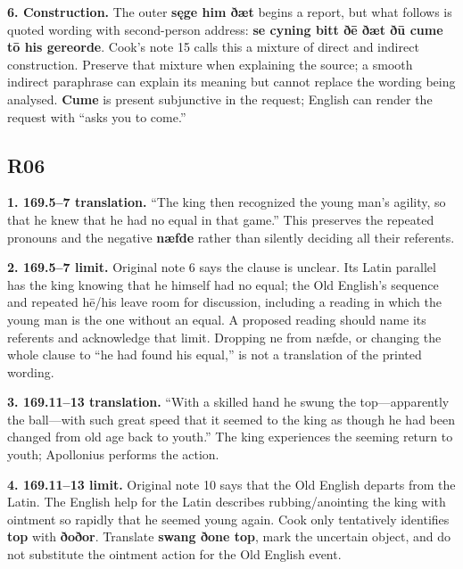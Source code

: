 \textbf{6. Construction.} The outer \textbf{sęge him ðæt} begins a report, but what follows is quoted wording with second-person address: \textbf{se cyning bitt ðē ðæt ðū cume tō his gereorde}. Cook’s note 15 calls this a mixture of direct and indirect construction. Preserve that mixture when explaining the source; a smooth indirect paraphrase can explain its meaning but cannot replace the wording being analysed. \textbf{Cume} is present subjunctive in the request; English can render the request with “asks you to come.”

\subsection*{R06}

\textbf{1. 169.5–7 translation.} “The king then recognized the young man’s agility, so that he knew that he had no equal in that game.” This preserves the repeated pronouns and the negative \textbf{næfde} rather than silently deciding all their referents.

\textbf{2. 169.5–7 limit.} Original note 6 says the clause is unclear. Its Latin parallel has the king knowing that he himself had no equal; the Old English’s sequence and repeated hē/\allowbreak{}his leave room for discussion, including a reading in which the young man is the one without an equal. A proposed reading should name its referents and acknowledge that limit. Dropping ne from næfde, or changing the whole clause to “he had found his equal,” is not a translation of the printed wording.

\textbf{3. 169.11–13 translation.} “With a skilled hand he swung the top—apparently the ball—with such great speed that it seemed to the king as though he had been changed from old age back to youth.” The king experiences the seeming return to youth; Apollonius performs the action.

\textbf{4. 169.11–13 limit.} Original note 10 says that the Old English departs from the Latin. The English help for the Latin describes rubbing/\allowbreak{}anointing the king with ointment so rapidly that he seemed young again. Cook only tentatively identifies \textbf{top} with \textbf{ðoðor}. Translate \textbf{swang ðone top}, mark the uncertain object, and do not substitute the ointment action for the Old English event.


\par\label{end-ch16-key}
\clearpage\endgroup

